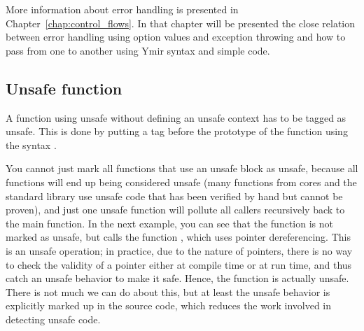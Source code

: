 
More information about error handling is presented in
Chapter~\ref{chap:control_flows}. In that chapter will be presented the close
relation between error handling using option values and exception throwing and
how to pass from one to another using Ymir syntax and simple code.

\subsection {Unsafe function}

A function using unsafe without defining an unsafe context has to be tagged as
unsafe. This is done by putting a tag before the prototype of the function using
the syntax .



You cannot just mark all functions that use an unsafe block as unsafe, because
all functions will end up being considered unsafe (many functions from cores and
the standard library use unsafe code that has been verified by hand but cannot
be proven), and just one unsafe function will pollute all callers recursively
back to the main function. In the next example, you can see that the function
 is not marked as unsafe, but calls the function , which
uses pointer dereferencing. This is an unsafe operation; in practice, due to the
nature of pointers, there is no way to check the validity of a pointer either at
compile time or at run time, and thus catch an unsafe behavior to make it safe.
Hence, the  function is actually unsafe. There is not much we can do
about this, but at least the unsafe behavior is explicitly marked up in the
source code, which reduces the work involved in detecting unsafe code.

